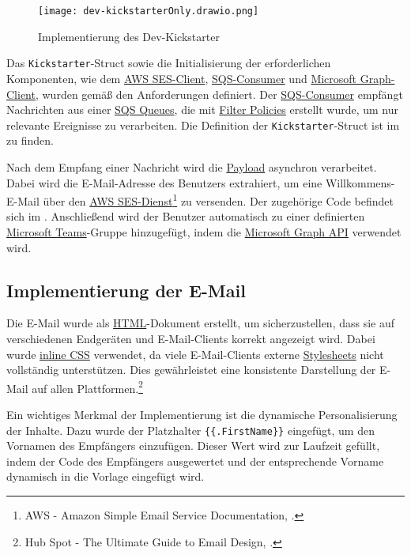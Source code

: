 \begin{figure}[htb]
    \centering
    \texttt{[image: dev-kickstarterOnly.drawio.png]}
    \caption{Implementierung des Dev-Kickstarter}
\end{figure}

Das \texttt{Kickstarter}-Struct sowie die Initialisierung der erforderlichen Komponenten, wie dem \hyperlink{AWSSESClient}{\textcolor{AOBlau}{AWS SES-Client}}, \hyperlink{SQSConsumer}{\textcolor{AOBlau}{SQS-Consumer}} und \hyperlink{GraphClient}{\textcolor{AOBlau}{Microsoft Graph-Client}}, wurden gemäß den Anforderungen definiert. Der \hyperlink{SQSConsumer}{\textcolor{AOBlau}{SQS-Consumer}} empfängt Nachrichten aus einer \hyperlink{SQS}{\textcolor{AOBlau}{SQS Queues}}, die mit \hyperlink{FilterPolicies}{\textcolor{AOBlau}{Filter Policies}} erstellt wurde, um nur relevante Ereignisse zu verarbeiten. Die Definition der \texttt{Kickstarter}-Struct ist im  zu finden.

Nach dem Empfang einer Nachricht wird die \hyperlink{Payload}{\textcolor{AOBlau}{Payload}} asynchron verarbeitet. Dabei wird die E-Mail-Adresse des Benutzers extrahiert, um eine Willkommens-E-Mail über den \hyperlink{AWSSESClient}{\textcolor{AOBlau}{AWS SES-Dienst}}\footnote{AWS - Amazon Simple Email Service Documentation, \cite{aws2023ses}.} zu versenden. Der zugehörige Code befindet sich im . Anschließend wird der Benutzer automatisch zu einer definierten \hyperlink{MicrosoftTeams}{\textcolor{AOBlau}{Microsoft Teams}}-Gruppe hinzugefügt, indem die \hyperlink{MicrosoftGraphAPI}{\textcolor{AOBlau}{Microsoft Graph API}} verwendet wird.


\subsection{Implementierung der E-Mail}
\label{sec:ImplementierungGeschaeftslogik}

Die E-Mail wurde als \hyperlink{HTML}{\textcolor{AOBlau}{HTML}}-Dokument erstellt, um sicherzustellen, dass sie auf verschiedenen Endgeräten und E-Mail-Clients korrekt angezeigt wird. Dabei wurde \hyperlink{CSS}{\textcolor{AOBlau}{inline CSS}} verwendet, da viele E-Mail-Clients externe \hyperlink{CSS}{\textcolor{AOBlau}{Stylesheets}} nicht vollständig unterstützen. Dies gewährleistet eine konsistente Darstellung der E-Mail auf allen Plattformen.\footnote{Hub Spot - The Ultimate Guide to Email Design, \cite{HubSpot}.}

Ein wichtiges Merkmal der Implementierung ist die dynamische Personalisierung der Inhalte. Dazu wurde der Platzhalter \texttt{\{\{.FirstName\}\}} eingefügt, um den Vornamen des Empfängers einzufügen. Dieser Wert wird zur Laufzeit gefüllt, indem der Code des Empfängers ausgewertet und der entsprechende Vorname dynamisch in die Vorlage eingefügt wird.

